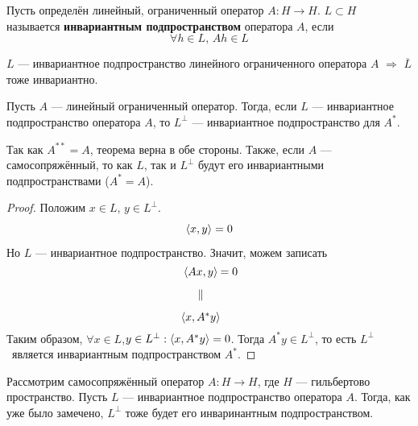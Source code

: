 \documentclass[12pt]{article}
\begin{document}
		\begin{defi}
			Пусть определён линейный, ограниченный оператор $A: H \rightarrow H$. 
			$L \subset H$ называется \textbf{инвариантным подпространством}
			оператора $A$, если 
			$$\forall h \in L,\, Ah \in L$$
		\end{defi}
	
		\begin{state}
			$L$ --- инвариантное подпространство линейного ограниченного оператора $A$
			$\Rightarrow$ $\overline L$ тоже инвариантно.
		\end{state}
		\begin{theorem}
			Пусть $A$ --- линейный ограниченный оператор. Тогда, если $L$ --- инвариантное подпространство оператора $A$, то 
			$L^{\perp}$ --- инвариантное подпространство для $A^*$.
		\end{theorem}
		Так как $A^{**} = A$, теорема верна в обе стороны. Также, если $A$ --- самосопряжённый, то как $L$, так и 
		$L^{\perp}$ будут его инвариантными подпространствами ($A^* = A$).
		\begin{proof}
			Положим $x \in L$, $y \in L^{\perp}$.
			$$\left\langle x, y \right\rangle = 0$$
			Но $L$ --- инвариантное подпространство. Значит, можем записать
			$$
			\begin{CD}
				\scal{Ax}{y} @. = 0 \\
				\parallel \\
				\scal{x}{A^*y}
			\end{CD}
			$$
			Таким образом, $\forall x \in L$,$y \in L^{\perp}: \left\langle x, A^*y \right\rangle = 0$. Тогда $A^*y \in L^{\perp}$, то есть
			$L^{\perp}$~является инвариантным подпространством $A^*$.
		\end{proof}
	
		Рассмотрим самосопряжённый оператор $A:H\rightarrow H$, где $H$ --- гильбертово пространство. Пусть $L$ --- инвариантное 
		подпространство оператора $A$. Тогда, как уже было замечено, $L^{\perp}$ тоже будет его инваринантным подпространством.
	
\end{document}
